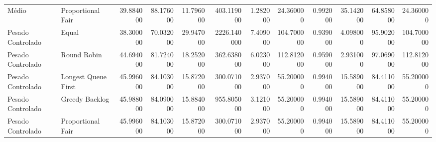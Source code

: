 \begin{longtable}{llrrrrrrrrrr}
Médio & Proportional Fair & 39.884000 & 88.176000 & 11.796000 & 403.119000 & 1.282000 & 24.360000 & 0.992000 & 35.142000 & 64.858000 & 24.360000 \\
Pesado Controlado & Equal & 38.300000 & 70.032000 & 29.947000 & 2226.140000 & 7.409000 & 104.700000 & 0.939000 & 4.098000 & 95.902000 & 104.700000 \\
Pesado Controlado & Round Robin & 44.694000 & 81.724000 & 18.252000 & 362.638000 & 6.023000 & 112.812000 & 0.959000 & 2.931000 & 97.069000 & 112.812000 \\
Pesado Controlado & Longest Queue First & 45.996000 & 84.103000 & 15.872000 & 300.071000 & 2.937000 & 55.200000 & 0.994000 & 15.589000 & 84.411000 & 55.200000 \\
Pesado Controlado & Greedy Backlog & 45.988000 & 84.090000 & 15.884000 & 955.805000 & 3.121000 & 55.200000 & 0.994000 & 15.589000 & 84.411000 & 55.200000 \\
Pesado Controlado & Proportional Fair & 45.996000 & 84.103000 & 15.872000 & 300.071000 & 2.937000 & 55.200000 & 0.994000 & 15.589000 & 84.411000 & 55.200000 \\
\end{longtable}
